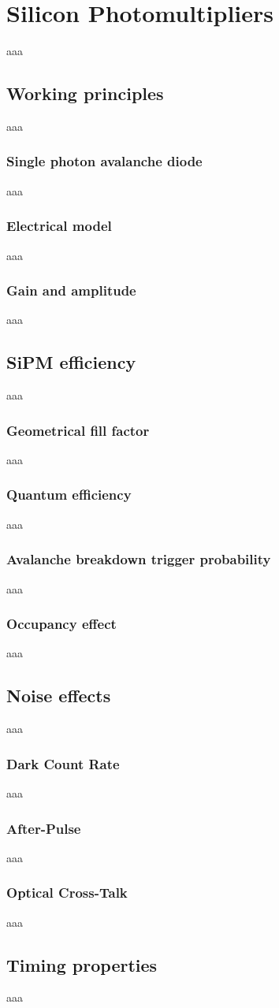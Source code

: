 \chapter{Silicon Photomultipliers}
aaa

\section{Working principles}\label{subsec:SiPM_work}
aaa

\subsection*{Single photon avalanche diode}
aaa

\subsection*{Electrical model}
aaa

\subsection*{Gain and amplitude}
aaa

\section{SiPM efficiency}
aaa

\subsection*{Geometrical fill factor}
aaa

\subsection*{Quantum efficiency}
aaa

\subsection*{Avalanche breakdown trigger probability}
aaa

\subsection{Occupancy effect}\label{subsec:occupancy_teo}
aaa

\section{Noise effects}
aaa

\subsection{Dark Count Rate}
aaa

\subsection{After-Pulse}
aaa

\subsection{Optical Cross-Talk}
aaa

\section{Timing properties}
aaa